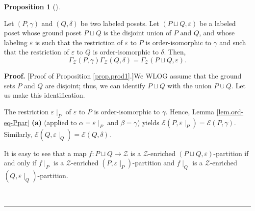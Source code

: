 \documentclass[numbers=enddot,12pt,final,onecolumn,notitlepage]{scrartcl}%
\theoremstyle{definition}
\newtheorem{prop}[theo]{Proposition}
\newenvironment{proposition}[1][]
{\begin{prop}[#1]\begin{leftbar}}
{\end{leftbar}\end{prop}}
\newenvironment{proof}[1][Proof]{\noindent\textbf{#1.} }{\ \rule{0.5em}{0.5em}}
\newenvironment{vershort}{}{}
\begin{document}
\begin{proposition}
\label{prop.prod1}Let $\left(  P,\gamma\right)  $ and $\left(  Q,\delta
\right)  $ be two labeled posets. Let $\left(  P\sqcup Q,\varepsilon\right)  $
be a labeled poset whose ground poset $P\sqcup Q$ is the disjoint union of $P$
and $Q$, and whose labeling $\varepsilon$ is such that the restriction of
$\varepsilon$ to $P$ is order-isomorphic to $\gamma$ and such that the
restriction of $\varepsilon$ to $Q$ is order-isomorphic to $\delta$. Then,%
\[
\Gamma_{\mathcal{Z}}\left(  P,\gamma\right)  \Gamma_{\mathcal{Z}}\left(
Q,\delta\right)  =\Gamma_{\mathcal{Z}}\left(  P\sqcup Q,\varepsilon\right)  .
\]

\end{proposition}

\begin{proof}
[Proof of Proposition \ref{prop.prod1}.]We WLOG assume that the ground sets
$P$ and $Q$ are disjoint; thus, we can identify $P\sqcup Q$ with the union
$P\cup Q$.
Let us make this identification.

The restriction $\varepsilon\mid_P$ of $\varepsilon$ to $P$ is order-isomorphic
to $\gamma$. Hence, Lemma \ref{lem.ord-eq-Ppar} \textbf{(a)} (applied to
$\alpha = \varepsilon\mid_P$ and $\beta = \gamma$) yields
$\mathcal{E}\left(P, \varepsilon\mid_P\right)
= \mathcal{E}\left(P, \gamma\right)$.
Similarly,
$\mathcal{E}\left(Q, \varepsilon\mid_Q\right)
= \mathcal{E}\left(Q, \delta\right)$.

\begin{vershort}
It is easy to see that a map $f : P \sqcup Q \to \mathcal{Z}$
is a $\mathcal{Z}$-enriched $\left(P \sqcup Q, \varepsilon\right)$-partition
if and only if $f \mid_P$ is a $\mathcal{Z}$-enriched
$\left(  P,\varepsilon\mid_P\right)$-partition and
$f \mid_Q$ is a $\mathcal{Z}$-enriched
$\left(  Q,\varepsilon\mid_Q\right)$-partition.
\end{vershort}


\end{proof}
\end{document}
